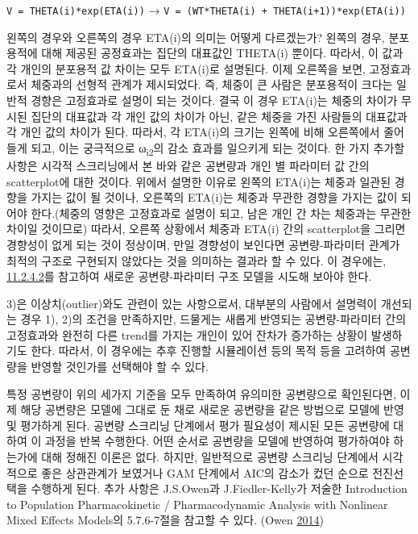 \documentclass[
  10pt,
  krantz2,
  a4paper]{krantz}
\theoremstyle{definition}
\theoremstyle{definition}
\theoremstyle{definition}
\theoremstyle{remark}
\begin{document}
\texttt{V\ =\ THETA(i)*exp(ETA(i))} → \texttt{V\ =\ (WT*THETA(i)\ +\ THETA(i+1))*exp(ETA(i))}

왼쪽의 경우와 오른쪽의 경우 ETA(i)의 의미는 어떻게 다르겠는가? 왼쪽의 경우, 분포용적에 대해 제공된 공정효과는 집단의 대표값인 THETA(i) 뿐이다. 따라서, 이 값과 각 개인의 분포용적 값 차이는 모두 ETA(i)로 설명된다. 이제 오른쪽을 보면, 고정효과로서 체중과의 선형적 관계가 제시되었다. 즉, 체중이 큰 사람은 분포용적이 크다는 일반적 경향은 고정효과로 설명이 되는 것이다. 결국 이 경우 ETA(i)는 체중의 차이가 무시된 집단의 대표값과 각 개인 값의 차이가 아닌, 같은 체중을 가진 사람들의 대표값과 각 개인 값의 차이가 된다. 따라서, 각 ETA(i)의 크기는 왼쪽에 비해 오른쪽에서 줄어들게 되고, 이는 궁극적으로 ω\textsubscript{i2}의 감소 효과를 일으키게 되는 것이다. 한 가지 추가할 사항은 시각적 스크리닝에서 본 바와 같은 공변량과 개인 별 파라미터 값 간의 scatterplot에 대한 것이다. 위에서 설명한 이유로 왼쪽의 ETA(i)는 체중과 일관된 경향을 가지는 값이 될 것이나, 오른쪽의 ETA(i)는 체중과 무관한 경향을 가지는 값이 되어야 한다.(체중의 영향은 고정효과로 설명이 되고, 남은 개인 간 차는 체중과는 무관한 차이일 것이므로) 따라서, 오른쪽 상황에서 체중과 ETA(i) 간의 scatterplot을 그리면 경향성이 없게 되는 것이 정상이며, 만일 경향성이 보인다면 공변량-파라미터 관계가 최적의 구조로 구현되지 않았다는 것을 의미하는 결과라 할 수 있다. 이 경우에는, \protect\hyperlink{cov-param}{11.2.4.2}를 참고하여 새로운 공변량-파라미터 구조 모델을 시도해 보아야 한다.

3)은 이상치(outlier)와도 관련이 있는 사항으로서, 대부분의 사람에서 설명력이 개선되는 경우 1), 2)의 조건을 만족하지만, 드물게는 새롭게 반영되는 공변량-파라미터 간의 고정효과와 완전히 다른 trend를 가지는 개인이 있어 잔차가 증가하는 상황이 발생하기도 한다. 따라서, 이 경우에는 추후 진행할 시뮬레이션 등의 목적 등을 고려하여 공변량을 반영할 것인가를 선택해야 할 수 있다.

특정 공변량이 위의 세가지 기준을 모두 만족하여 유의미한 공변량으로 확인된다면, 이제 해당 공변량은 모델에 그대로 둔 채로 새로운 공변량을 같은 방법으로 모델에 반영 및 평가하게 된다. 공변량 스크리닝 단계에서 평가 필요성이 제시된 모든 공변량에 대하여 이 과정을 반복 수행한다. 어떤 순서로 공변량을 모델에 반영하여 평가하여야 하는가에 대해 정해진 이론은 없다. 하지만, 일반적으로 공변량 스크리닝 단계에서 시각적으로 좋은 상관관계가 보였거나 GAM 단계에서 AIC의 감소가 컸던 순으로 전진선택을 수행하게 된다. 추가 사항은 J.S.Owen과 J.Fiedler-Kelly가 저술한 Introduction to Population Pharmacokinetic / Pharmacodynamic Analysis with Nonlinear Mixed Effects Models의 5.7.6-7절을 참고할 수 있다. (Owen \protect\hyperlink{ref-kelly}{2014})
\end{document}
